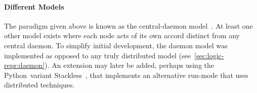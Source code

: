 \paragraph{Different Models}
The paradigm given above is known as the central-daemon model~\autocite{dew:sem}.
At least one other model exists where each node acts
  of its own accord distinct from any central daemon.
To simplify initial development, the daemon model was implemented
  as opposed to any truly distributed model (see~\autoref{sec:logic-repr:daemon}).
An extension may later be added, perhaps using the Python~variant Stackless~\autocite{stackless},
  that implements an alternative run-mode that uses distributed techniques.

